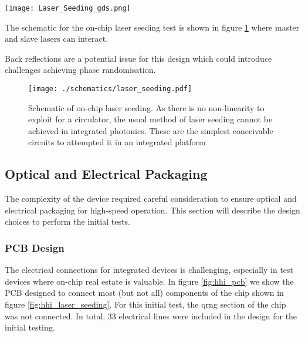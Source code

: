 \begin{sidewaysfigure}
	\centering
	\texttt{[image: Laser\_Seeding\_gds.png]}
	\caption[InP laser seeding transmitter with QRNG]{This shows the layout of the laser seeded transmitter device fabricated by HHI. The chip measures \SI[product-units=power]{6x4}{mm} and contains two laser seeding prototype circuits, a homodyne \ac{qrng} and test structure to measure laser and waveguide performances. This demonstrates the complexity and compactness possible in the integrated platform.}
	\label{fig:hhi_laser_seeding}
\end{sidewaysfigure}

The schematic for the on-chip laser seeding test is shown in figure \ref{fig:las_seed_schem} where master and slave lasers can interact.

Back reflections are a potential issue for this design which could introduce challenges achieving phase randomisation.

\begin{figure}[tp]
	\centering
	\texttt{[image: ./schematics/laser\_seeding.pdf]}
	\caption[Schematic of on-chip laser seeding]{Schematic of on-chip laser seeding. As there is no non-linearity to exploit for a circulator, the usual method of laser seeding cannot be achieved in integrated photonics. These are the simplest conceivable circuits to attempted it in an integrated platform}
	\label{fig:las_seed_schem}
\end{figure}

\subsection{Optical and Electrical Packaging}

The complexity of the device required careful consideration to ensure optical and electrical packaging for high-speed operation. This section will describe the design choices to perform the initial tests.

\subsubsection*{PCB Design}

The electrical connections for integrated devices is challenging, especially in test devices where on-chip real estate is valuable. In figure \ref{fig:hhi_pcb} we show the PCB designed to connect most (but not all) components of the chip shown in figure \ref{fig:hhi_laser_seeding}. For this initial test, the \ac{qrng} section of the chip was not connected. In total, 33 electrical lines were included in the design for the initial testing.

